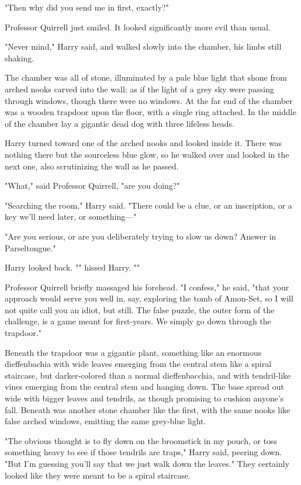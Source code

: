 "Then why did you send me in first, exactly?"

Professor Quirrell just smiled. It looked significantly more evil than usual.

"Never mind," Harry said, and walked slowly into the chamber, his limbs still 
shaking.

The chamber was all of stone, illuminated by a pale blue light that shone from 
arched nooks carved into the wall; as if the light of a grey sky were passing 
through windows, though there were no windows. At the far end of the chamber 
was a wooden trapdoor upon the floor, with a single ring attached. In the 
middle of the chamber lay a gigantic dead dog with three lifeless heads.

Harry turned toward one of the arched nooks and looked inside it. There was 
nothing there but the sourceless blue glow, so he walked over and looked in the 
next one, also scrutinizing the wall as he passed.

"What," said Professor Quirrell, "are you doing?"

"Searching the room," Harry said. "There could be a clue, or an inscription, or 
a key we'll need later, or something---"

"Are you serious, or are you deliberately trying to slow us down? Answer in 
Parseltongue."

Harry looked back. "" hissed Harry. ""

Professor Quirrell briefly massaged his forehead. "I confess," he said, "that 
your approach would serve you well in, say, exploring the tomb of Amon-Set, so 
I will not quite call you an idiot, but still. The false puzzle, the outer form 
of the challenge, is a game meant for first-years. We simply go down through 
the trapdoor."

Beneath the trapdoor was a gigantic plant, something like an enormous 
dieffenbachia with wide leaves emerging from the central stem like a spiral 
staircase, but darker-colored than a normal dieffenbacchia, and with 
tendril-like vines emerging from the central stem and hanging down. The base 
spread out wide with bigger leaves and tendrils, as though promising to cushion 
anyone's fall. Beneath was another stone chamber like the first, with the same 
nooks like false arched windows, emitting the same grey-blue light.

"The obvious thought is to fly down on the broomstick in my pouch, or toss 
something heavy to see if those tendrils are traps," Harry said, peering down. 
"But I'm guessing you'll say that we just walk down the leaves." They certainly 
looked like they were meant to be a spiral staircase.

